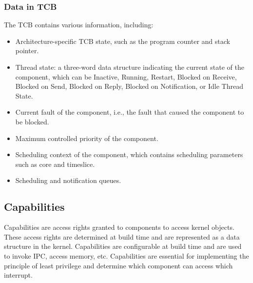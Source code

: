 \documentclass[
	a4paper, %
	11pt, %
	unnumberedsections, %
	twoside, %
]{LTJournalArticle}
\begin{document}
\subsubsection*{Data in TCB}
The TCB contains various information, including:
\begin{itemize}
\item Architecture-specific TCB state, such as the program counter and stack pointer.
\item Thread state: a three-word data structure indicating the current state of the component, which can be Inactive, Running, Restart, Blocked on Receive, Blocked on Send, Blocked on Reply, Blocked on Notification, or Idle Thread State.
\item Current fault of the component, i.e., the fault that caused the component to be blocked.
\item Maximum controlled priority of the component.
\item Scheduling context of the component, which contains scheduling parameters such as core and timeslice.
\item Scheduling and notification queues.
\end{itemize}

\subsection*{Capabilities}
Capabilities are access rights granted to components to access kernel objects. These access rights are determined at build time and are represented as a data structure in the kernel. Capabilities are configurable at build time and are used to invoke IPC, access memory, etc. Capabilities are essential for implementing the principle of least privilege and determine which component can access which interrupt.




\newpage


\printbibliography%
\end{document}
